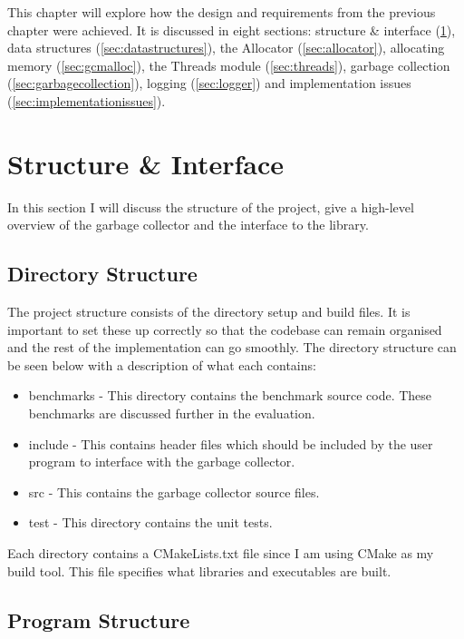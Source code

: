 \documentclass[../diss.tex]{subfiles}
\begin{document}
This chapter will explore how the design and requirements from the previous chapter were achieved. It is discussed in eight sections: structure \& interface (\cref{sec:structureandinterface}), data structures (\cref{sec:datastructures}), the Allocator (\cref{sec:allocator}), allocating memory (\cref{sec:gcmalloc}), the Threads module (\cref{sec:threads}), garbage collection (\cref{sec:garbagecollection}), logging (\cref{sec:logger}) and implementation issues (\cref{sec:implementationissues}).

\section{Structure \& Interface}
\label{sec:structureandinterface}

In this section I will discuss the structure of the project, give a high-level overview of the garbage collector and the interface to the library.

\subsection{Directory Structure}

The project structure consists of the directory setup and build files. It is important to set these up correctly so that the codebase can remain organised and the rest of the implementation can go smoothly. The directory structure can be seen below with a description of what each contains:
\begin{itemize}
    \item benchmarks - This directory contains the benchmark source code. These benchmarks are discussed further in the evaluation.
    \item include - This contains header files which should be included by the user program to interface with the garbage collector.
    \item src - This contains the garbage collector source files.
    \item test - This directory contains the unit tests.
\end{itemize}

Each directory contains a CMakeLists.txt file since I am using CMake as my build tool. This file specifies what libraries and executables are built.

\subsection{Program Structure}
\end{document}

